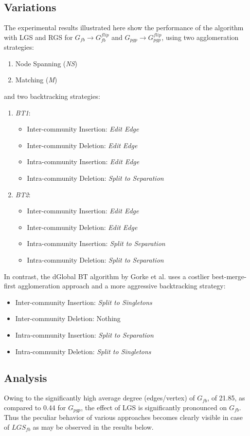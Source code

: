 \documentclass[conference]{IEEEtran}
\begin{document}
\subsection{Variations}
The experimental results illustrated here show the performance of the 
algorithm with LGS and RGS for $G_{fb} \rightarrow G^{flip}_{fb}$ and 
$G_{pgp} \rightarrow G^{flip}_{pgp}$, using two agglomeration strategies:
\begin{enumerate}[font=\itshape]
 \item Node Spanning (\emph{NS})
 \item Matching (\emph{M})
\end{enumerate}
and two backtracking strategies:
\begin{enumerate}[font=\itshape]
 \item \emph{BT1}:
\begin{itemize}
 \item Inter-community Insertion: \emph{Edit Edge}
 \item Inter-community Deletion: \emph{Edit Edge}
 \item Intra-community Insertion: \emph{Edit Edge}
 \item Intra-community Deletion: \emph{Split to Separation}
\end{itemize}
 \item \emph{BT2}:
\begin{itemize}
 \item Inter-community Insertion: \emph{Edit Edge}
 \item Inter-community Deletion: \emph{Edit Edge}
 \item Intra-community Insertion: \emph{Split to Separation}
 \item Intra-community Deletion: \emph{Split to Separation}
\end{itemize}
\end{enumerate}
In contrast, the dGlobal BT algorithm by Gorke et al. \cite{gor} uses a 
costlier best-merge-first agglomeration approach and a more aggressive 
backtracking strategy:
\begin{itemize}
 \item Inter-community Insertion: \emph{Split to Singletons}
 \item Inter-community Deletion: Nothing
 \item Intra-community Insertion: \emph{Split to Separation}
 \item Intra-community Deletion: \emph{Split to Singletons}
\end{itemize}
\subsection{Analysis}
Owing to the significantly high average degree (edges/vertex) of $G_{fb}$, of 
21.85, as compared to 0.44 for $G_{pgp}$, the effect of LGS is 
significantly pronounced on $G_{fb}$. Thus the peculiar behavior of various 
approaches becomes clearly visible in case of $LGS_{fb}$  as may be observed in 
the results below.
\end{document}

